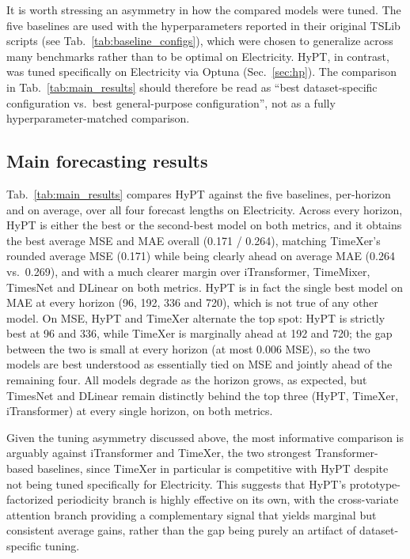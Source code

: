 \documentclass[10pt,journal]{IEEEtran}
\newcommand{\tab}[1]{Tab.~\ref{#1}}
\newcommand{\secref}[1]{Sec.~\ref{#1}}
\begin{document}
It is worth stressing an asymmetry in how the compared models were tuned. The five baselines are used with the hyperparameters reported in their original TSLib scripts (see \tab{tab:baseline_configs}), which were chosen to generalize across many benchmarks rather than to be optimal on Electricity. HyPT, in contrast, was tuned specifically on Electricity via Optuna (\secref{sec:hp}). The comparison in \tab{tab:main_results} should therefore be read as ``best dataset-specific configuration vs.\ best general-purpose configuration'', not as a fully hyperparameter-matched comparison.

\subsection{Main forecasting results}
\tab{tab:main_results} compares HyPT against the five baselines, per-horizon and on average, over all four forecast lengths on Electricity. Across every horizon, HyPT is either the best or the second-best model on both metrics, and it obtains the best average MSE and MAE overall (0.171 / 0.264), matching TimeXer's rounded average MSE (0.171) while being clearly ahead on average MAE (0.264 vs.\ 0.269), and with a much clearer margin over iTransformer, TimeMixer, TimesNet and DLinear on both metrics. HyPT is in fact the single best model on MAE at every horizon (96, 192, 336 and 720), which is not true of any other model. On MSE, HyPT and TimeXer alternate the top spot: HyPT is strictly best at 96 and 336, while TimeXer is marginally ahead at 192 and 720; the gap between the two is small at every horizon (at most 0.006 MSE), so the two models are best understood as essentially tied on MSE and jointly ahead of the remaining four. All models degrade as the horizon grows, as expected, but TimesNet and DLinear remain distinctly behind the top three (HyPT, TimeXer, iTransformer) at every single horizon, on both metrics.

Given the tuning asymmetry discussed above, the most informative comparison is arguably against iTransformer and TimeXer, the two strongest Transformer-based baselines, since TimeXer in particular is competitive with HyPT despite not being tuned specifically for Electricity. This suggests that HyPT's prototype-factorized periodicity branch is highly effective on its own, with the cross-variate attention branch providing a complementary signal that yields marginal but consistent average gains, rather than the gap being purely an artifact of dataset-specific tuning.
\end{document}
